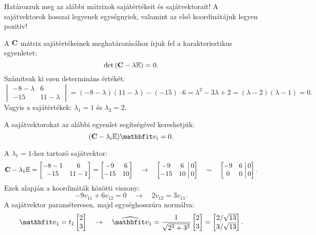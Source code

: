 \documentclass[exercise]{math-standalone}
\begin{document}
\begin{exercise}{%
    Határozzuk meg az alábbi mátrixok sajátértékeit és sajátvektorait!
    A sajátvektorok hosszai legyenek egységnyiek, valamint az első koordinátájuk
    legyen pozitív!
  }
{  A $\mathbf{C}$ mátrix sajátértékeinek meghatározásához írjuk fel a
  karakterisztikus egyenletet:
  \[
    \det \left( \mathbf{C} - \lambda {\mathbb{E}} \right) = 0
    \text{.}
  \]
  Számítsuk ki ezen determináns értékét:
  \[
    \begin{vmatrix}
      -8 - \lambda & 6           \\
      -15          & 11 -\lambda
    \end{vmatrix}
    = (-8 - \lambda)(11 - \lambda) - (-15) \cdot 6
    = \lambda^2 - 3\lambda + 2
    = (\lambda - 2)(\lambda - 1)
    = 0
    \text{.}
  \]
  Vagyis a sajátértékek: $\lambda_1 = 1$ és $\lambda_2 = 2$.

  \vspace{.66em}
  A sajátvektorokat az alábbi egyenlet segítségével kereshetjük:
  \[
    (\rmat C - \lambda_i \imat) \rvec v_i = 0
    \text{.}
  \]

  A $\lambda_1 = 1$-hez tartozó sajátvektor:
  \[
    \mathbf{C} - \lambda_1 {\mathbb{E}} = \begin{bmatrix}
      -8 - 1 & 6      \\
      -15    & 11 - 1
    \end{bmatrix} = \begin{bmatrix}
      -9  & 6  \\
      -15 & 10
    \end{bmatrix}
    \quad \rightarrow \quad
    \left[\begin{matrix}
        -9  & 6  \\
        -15 & 10
      \end{matrix}\right.\left|\begin{matrix}
        \,0 \\ \,0
      \end{matrix}\right]
    \quad \sim \quad
    \left[\begin{matrix}
        -9 & 6 \\
        0  & 0
      \end{matrix}\right.\left|\begin{matrix}
        \,0 \\ \,0
      \end{matrix}\right]
    \text{.}
  \]
  Ezek alapján a koordináták közötti viszony:
  \[
    -9v_{11} + 6v_{12} = 0
    \quad \rightarrow \quad
    2 v_{12} = 3 v_{11}
    \text{.}
  \]
  A sajátvektor paraméteresen, majd egységhosszúra normálva:
  \[
    \rvec v_1 = t_1 \begin{bmatrix}
      2 \\ 3
    \end{bmatrix}
    \quad
    \rightarrow
    \quad
    \uvec v_1 = \frac{1}{\sqrt{2^2 + 3^2}}\begin{bmatrix}
      2 \\ 3
    \end{bmatrix} = \begin{bmatrix}
      2 / \sqrt{13} \\
      3 / \sqrt{13}
    \end{bmatrix}
    \text{.}
  \]

}
\end{exercise}
\end{document}
